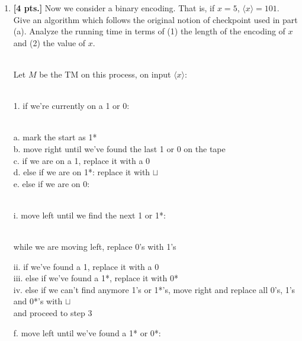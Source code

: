 \documentclass[11pt]{article}
\theoremstyle{definition}
\theoremstyle{theorem}
\newcommand{\solution}{\medskip\noindent{\color{blue}\textbf{Solution:}}}
\begin{document}
\begin{enumerate}[label=(\alph*)]
\item \textbf{[4 pts.]} Now we consider a binary encoding. That is, if $x = 5$, $\langle x \rangle = 101$.
Give an algorithm which follows the original notion of checkpoint used in part (a). Analyze the running time in terms of (1) the length of the encoding of $x$ and (2) the value of $x$.

\solution \\
Let $M$ be the TM on this process, on input $\langle x \rangle$: \\~\\
\hspace*{0.5cm}
\begin{minipage}{0.9\textwidth}
1. if we're currently on a 1 or 0: \\~\\
\hspace*{0.6cm}
\begin{minipage}{1.2\textwidth}
	  a. mark the start as 1* \\
	  b. move right until we've found the last 1 or 0 on the tape \\
	  c. if we are on a 1, replace it with a 0\\
	  d. else if we are on 1*: replace it with $\sqcup$\\
	  e. else if we are on 0: \\~\\
	  \hspace*{0.37cm}
	  \begin{minipage}{1.1\textwidth}
		i. move left until we find the next 1 or 1*: \\~\\
		\hspace*{0.7cm}
		\begin{minipage}{1.2\textwidth}
			while we are moving left, replace 0's with 1's \\
		\end{minipage}
		ii. if we've found a 1, replace it with a 0 \\
		iii. else if we've found a 1*, replace it with 0* \\
		iv. else if we can't find anymore 1's or 1*'s, move right and replace all 0's, 1's and 0*'s with $\sqcup$\\
		and proceed to step 3  \\
	  \end{minipage}
	  f. move left until we've found a 1* or 0*: \\~\\
	\hspace*{0.6cm}

\end{minipage}
\end{minipage}
\end{enumerate}
\end{document}
